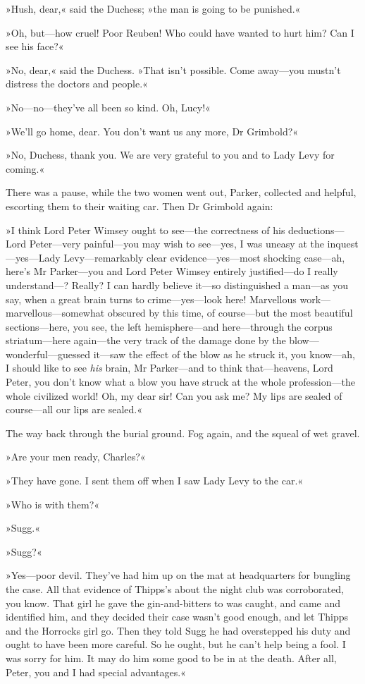 »Hush, dear,« said the Duchess; »the man is going to be punished.«

»Oh, but—how cruel! Poor Reuben! Who could have wanted to hurt him? Can I see his face?«

»No, dear,« said the Duchess. »That isn't possible. Come away—you mustn't distress the doctors and people.«

»No—no---they've all been so kind. Oh, Lucy!«

»We'll go home, dear. You don't want us any more, Dr Grimbold?«

»No, Duchess, thank you. We are very grateful to you and to Lady Levy for coming.«

There was a pause, while the two women went out, Parker, collected and helpful, escorting them to their waiting car. Then Dr Grimbold again:

»I think Lord Peter Wimsey ought to see—the correctness of his deductions—Lord Peter—very painful—you may wish to see—yes, I was uneasy at the inquest—yes---Lady Levy—remarkably clear evidence—yes---most shocking case—ah, here's Mr Parker—you and Lord Peter Wimsey entirely justified—do I really under\-stand---? Really? I can hardly believe it—so distinguished a man—as you say, when a great brain turns to crime—yes---look here! Marvellous work—marvellous---somewhat obscured by this time, of course—but the most beautiful sections—here, you see, the left hemisphere—and here—through the corpus striatum—here again—the very track of the damage done by the blow—wonderful---guessed it—saw the effect of the blow as he struck it, you know—ah, I should like to see \textit{his} brain, Mr Parker—and to think that—heavens, Lord Peter, you don't know what a blow you have struck at the whole profession—the whole civilized world! Oh, my dear sir! Can you ask me? My lips are sealed of course—all our lips are sealed.«

The way back through the burial ground. Fog again, and the squeal of wet gravel.

»Are your men ready, Charles?«

»They have gone. I sent them off when I saw Lady Levy to the car.«

»Who is with them?«

»Sugg.«

»Sugg?«

»Yes—poor devil. They've had him up on the mat at headquarters for bungling the case. All that evidence of Thipps's about the night club was corroborated, you know. That girl he gave the gin-and-bitters to was caught, and came and identified him, and they decided their case wasn't good enough, and let Thipps and the Horrocks girl go. Then they told Sugg he had overstepped his duty and ought to have been more careful. So he ought, but he can't help being a fool. I was sorry for him. It may do him some good to be in at the death. After all, Peter, you and I had special advantages.«

